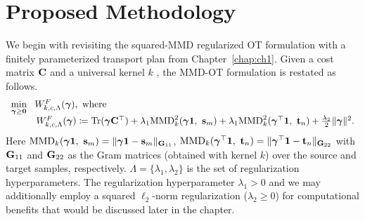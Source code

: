 \section{Proposed Methodology}\label{sec:sot-meth}
We begin with revisiting the squared-MMD regularized OT formulation with a finitely parameterized transport plan from Chapter~\ref{chap:ch1}. Given a cost matrix $\mathbf{C}$ and a universal kernel $k$ \citep{SriperumbudurFL11}, the MMD-OT formulation is restated as follows.
\begin{equation}\label{eqn:uotmmd}
\begin{array}{l}
\min\limits_{\bm{\gamma}\geq \mathbf{0}} \ \ W^F_{k, c, \Lambda}(\bm{\gamma}), \ \rm{where} \\
~~\qquad W^F_{k, c, \Lambda}(\bm{\gamma})\coloneqq \textup{Tr}(\bm{\gamma} \mathbf{C}^\top) 
+ \lambda_1{\rm MMD}^2_k(\bm{\gamma}\mathbf{1},\ \mathbf{s}_m) 
+ \lambda_1{\rm MMD}^2_k(\bm{\gamma}^\top\mathbf{1},\ \mathbf{t}_n)+ \frac{\lambda_2}{2}\|\bm{\gamma}\|^2.
\end{array}
\end{equation}
Here ${\rm MMD}_k(\bm{\gamma}\mathbf{1},\ \mathbf{s}_m) = \|\bm{\gamma}\mathbf{1}-\mathbf{s}_m\|_{\mathbf{G}_{11}}$, ${\rm MMD}_k(\bm{\gamma}^\top\mathbf{1},\ \mathbf{t}_n) = \|\bm{\gamma}^\top\mathbf{1}-\mathbf{t}_n\|_{\mathbf{G}_{22}}$ with $\mathbf{G}_{11}$ and $\mathbf{G}_{22}$ as the Gram matrices (obtained with kernel $k$) over the source and target samples, respectively. $\Lambda=\{\lambda_1, \lambda_2\}$ is the set of regularization hyperparameters. The regularization hyperparameter $\lambda_1>0$ and we may additionally employ a squared $\ell_2$-norm regularization ($\lambda_2\geq 0$) for computational benefits that would be discussed later in the chapter.

